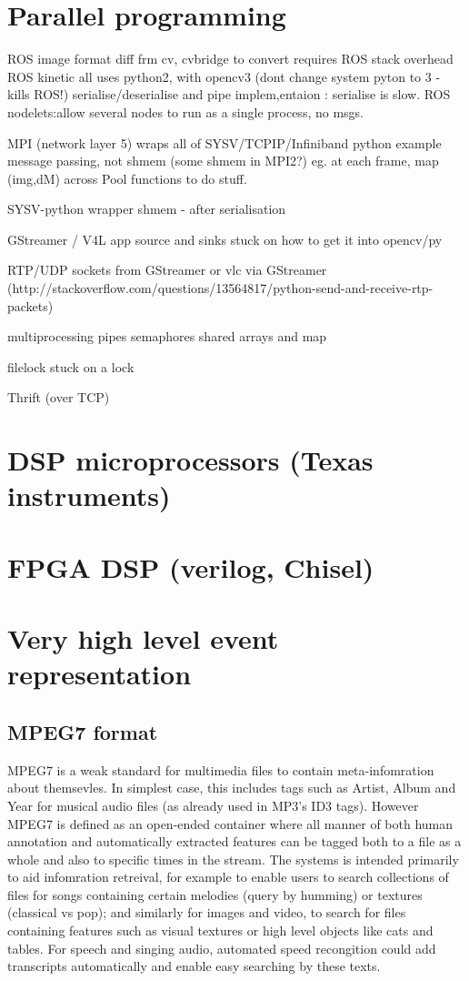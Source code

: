\documentclass[oneside,english]{scrbook}
\begin{document}
\chapter{Parallel programming}

ROS image format diff frm cv, cvbridge to convert requires ROS stack
overhead ROS kinetic all uses python2, with opencv3 (dont change system
pyton to 3 - kills ROS!) serialise/deserialise and pipe implem,entaion
: serialise is slow. ROS nodelets:allow several nodes to run as a
single process, no msgs.

MPI (network layer 5) wraps all of SYSV/TCPIP/Infiniband python example
message passing, not shmem (some shmem in MPI2?) eg. at each frame,
map (img,dM) across Pool functions to do stuff.

SYSV-python wrapper shmem - after serialisation

GStreamer / V4L app source and sinks stuck on how to get it into opencv/py

RTP/UDP sockets from GStreamer or vlc via GStreamer (http://stackoverflow.com/questions/13564817/python-send-and-receive-rtp-packets)

multiprocessing pipes semaphores shared arrays and map

filelock stuck on a lock

Thrift (over TCP)


\chapter{DSP microprocessors (Texas instruments)}

\chapter{FPGA DSP (verilog, Chisel)}


\chapter{Very high level event representation}

\section{MPEG7 format}

MPEG7 is a weak standard for multimedia files to contain meta-infomration about themsevles.  In simplest case, this includes tags such as Artist, Album and Year for musical audio files (as already used in MP3's ID3 tags).  However MPEG7 is defined as an open-ended container where all manner of both human annotation and automatically extracted features can be tagged both to a file as a whole and also to specific times in the stream.  The systems is intended primarily to aid infomration retreival, for example to enable users to search collections of files for songs containing certain melodies (query by humming) or textures (classical vs pop); and similarly for images and video, to search for files containing features such as visual textures or high level objects like cats and tables.   For speech and singing audio, automated speed recongition could add transcripts automatically and enable easy searching by these texts.
\end{document}

